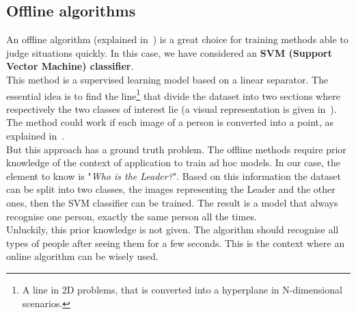 \subsection{Offline algorithms}
An offline algorithm (explained in~) is a great choice for training methods able to judge situations quickly. In this case, we have considered an \textbf{SVM (Support Vector Machine) classifier}.\\
This method is a supervised learning model based on a linear separator. The essential idea is to find the line\footnote{A line in 2D problems, that is converted into a hyperplane in N-dimensional scenarios.} that divide the dataset into two sections where respectively the two classes of interest lie (a visual representation is given in~). The method could work if each image of a person is converted into a point, as explained in~.\\
But this approach has a ground truth problem. The offline methods require prior knowledge of the context of application to train ad hoc models. In our case, the element to know is "\textit{Who is the Leader?}". Based on this information the dataset can be split into two classes, the images representing the Leader and the other ones, then the SVM classifier can be trained. The result is a model that always recognise one person, exactly the same person all the times.\\
Unluckily, this prior knowledge is not given. The algorithm should recognise all types of people after seeing them for a few seconds. This is the context where an online algorithm can be wisely used.
